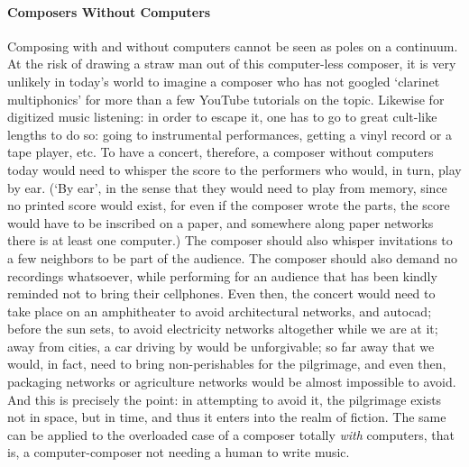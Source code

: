 \paragraph{Composers Without Computers}

Composing with and without computers cannot be seen as poles on a continuum. At the risk of drawing a straw man out of this computer-less composer, it is very unlikely in today's world to imagine a composer who has not googled `clarinet multiphonics' for more than a few YouTube tutorials on the topic. Likewise for digitized music listening: in order to escape it, one has to go to great cult-like lengths to do so: going to instrumental performances, getting a vinyl record or a tape player, etc. To have a concert, therefore, a composer without computers today would need to whisper the score to the performers who would, in turn, play by ear. (`By ear', in the sense that they would need to play from memory, since no printed score would exist, for even if the composer wrote the parts, the score would have to be inscribed on a paper, and somewhere along paper networks there is at least one computer.) The composer should also whisper invitations to a few neighbors to be part of the audience. The composer should also demand no recordings whatsoever, while performing for an audience that has been kindly reminded not to bring their cellphones. Even then, the concert would need to take place on an amphitheater to avoid architectural networks, and \gls{autocad}; before the sun sets, to avoid electricity networks altogether while we are at it; away from cities, a car driving by would be unforgivable; so far away that we would, in fact, need to bring non-perishables for the pilgrimage, and even then, packaging networks or agriculture networks would be almost impossible to avoid. And this is precisely the point: in attempting to avoid it, the pilgrimage exists not in space, but in time, and thus it enters into the realm of fiction. The same can be applied to the overloaded case of a composer totally \textit{with} computers, that is, a computer-composer not needing a human to write music. 

